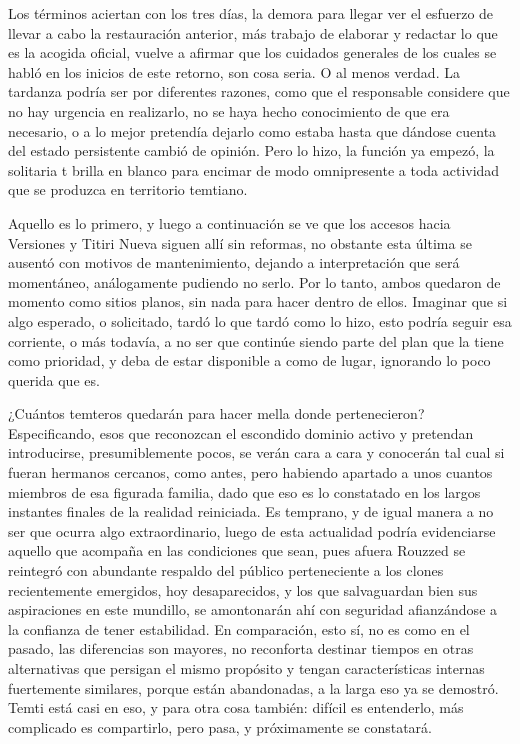 \documentclass[
  spanish,
]{book}
\begin{document}
Los términos aciertan con los tres días, la demora para llegar ver el esfuerzo de llevar a cabo la restauración anterior, más trabajo de elaborar y redactar lo que es la acogida oficial, vuelve a afirmar que los cuidados generales de los cuales se habló en los inicios de este retorno, son cosa seria. O al menos verdad. La tardanza podría ser por diferentes razones, como que el responsable considere que no hay urgencia en realizarlo, no se haya hecho conocimiento de que era necesario, o a lo mejor pretendía dejarlo como estaba hasta que dándose cuenta del estado persistente cambió de opinión. Pero lo hizo, la función ya empezó, la solitaria t brilla en blanco para encimar de modo omnipresente a toda actividad que se produzca en territorio temtiano.

Aquello es lo primero, y luego a continuación se ve que los accesos hacia Versiones y Titiri Nueva siguen allí sin reformas, no obstante esta última se ausentó con motivos de mantenimiento, dejando a interpretación que será momentáneo, análogamente pudiendo no serlo. Por lo tanto, ambos quedaron de momento como sitios planos, sin nada para hacer dentro de ellos. Imaginar que si algo esperado, o solicitado, tardó lo que tardó como lo hizo, esto podría seguir esa corriente, o más todavía, a no ser que continúe siendo parte del plan que la tiene como prioridad, y deba de estar disponible a como de lugar, ignorando lo poco querida que es.

¿Cuántos temteros quedarán para hacer mella donde pertenecieron? Especificando, esos que reconozcan el escondido dominio activo y pretendan introducirse, presumiblemente pocos, se verán cara a cara y conocerán tal cual si fueran hermanos cercanos, como antes, pero habiendo apartado a unos cuantos miembros de esa figurada familia, dado que eso es lo constatado en los largos instantes finales de la realidad reiniciada. Es temprano, y de igual manera a no ser que ocurra algo extraordinario, luego de esta actualidad podría evidenciarse aquello que acompaña en las condiciones que sean, pues afuera Rouzzed se reintegró con abundante respaldo del público perteneciente a los clones recientemente emergidos, hoy desaparecidos, y los que salvaguardan bien sus aspiraciones en este mundillo, se amontonarán ahí con seguridad afianzándose a la confianza de tener estabilidad. En comparación, esto sí, no es como en el pasado, las diferencias son mayores, no reconforta destinar tiempos en otras alternativas que persigan el mismo propósito y tengan características internas fuertemente similares, porque están abandonadas, a la larga eso ya se demostró. Temti está casi en eso, y para otra cosa también: difícil es entenderlo, más complicado es compartirlo, pero pasa, y próximamente se constatará.
\end{document}
